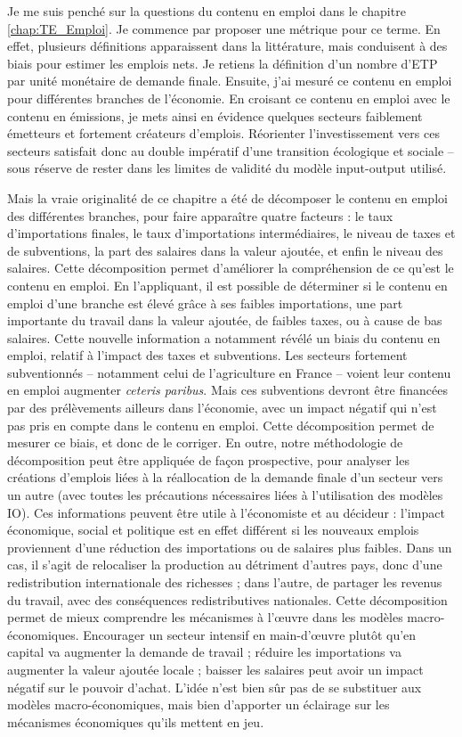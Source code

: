 Je me suis penché sur la questions du contenu en emploi dans le chapitre \ref{chap:TE_Emploi}. Je commence par proposer une métrique pour ce terme. En effet, plusieurs définitions apparaissent dans la littérature, mais conduisent à des biais pour estimer les emplois nets. Je retiens la définition d’un nombre d’ETP par unité monétaire de demande finale.
Ensuite, j’ai mesuré ce contenu en emploi pour différentes branches de l’économie. En croisant ce contenu en emploi avec le contenu en émissions, je mets ainsi en évidence quelques secteurs faiblement émetteurs et fortement créateurs d’emplois. Réorienter l’investissement vers ces secteurs satisfait donc au double impératif d’une transition écologique et sociale – sous réserve de rester dans les limites de validité du modèle input-output utilisé.

Mais la vraie originalité de ce chapitre a été de décomposer le contenu en emploi des différentes branches, pour faire apparaître quatre facteurs : le taux d’importations finales, le taux d’importations intermédiaires, le niveau de taxes et de subventions, la part des salaires dans la valeur ajoutée, et enfin le niveau des salaires.
Cette décomposition permet d’améliorer la compréhension de ce qu’est le contenu en emploi. En l’appliquant, il est possible de déterminer si le contenu en emploi d’une branche est élevé grâce à ses faibles importations, une part importante du travail dans la valeur ajoutée, de faibles taxes, ou à cause de bas salaires.
Cette nouvelle information a notamment révélé un biais du contenu en emploi, relatif à l’impact des taxes et subventions. Les secteurs fortement subventionnés -- notamment celui de l'agriculture en France -- voient leur contenu en emploi augmenter \textit{ceteris paribus}. Mais ces subventions devront être financées par des prélèvements ailleurs dans l’économie, avec un impact négatif qui n’est pas pris en compte dans le contenu en emploi. Cette décomposition permet de mesurer ce biais, et donc de le corriger. 
En outre, notre méthodologie de décomposition peut être appliquée de façon prospective, pour analyser les créations d’emplois liées à la réallocation de la demande finale d’un secteur vers un autre (avec toutes les précautions nécessaires liées à l’utilisation des modèles IO). Ces informations peuvent être utile à l’économiste et au décideur : l’impact économique, social et politique est en effet différent si les nouveaux emplois proviennent d’une réduction des importations ou de salaires plus faibles. Dans un cas, il s’agit de relocaliser la production au détriment d’autres pays, donc d’une redistribution internationale des richesses ; dans l’autre, de partager les revenus du travail, avec des conséquences redistributives nationales.
Cette décomposition permet de mieux comprendre les mécanismes à l’œuvre dans les modèles macro-économiques. Encourager un secteur intensif en main-d’œuvre plutôt qu’en capital va augmenter la demande de travail ; réduire les importations va augmenter la valeur ajoutée locale ; baisser les salaires peut avoir un impact négatif sur le pouvoir d’achat. L’idée n’est bien sûr pas de se substituer aux modèles macro-économiques, mais bien d’apporter un éclairage sur les mécanismes économiques qu’ils mettent en jeu.


